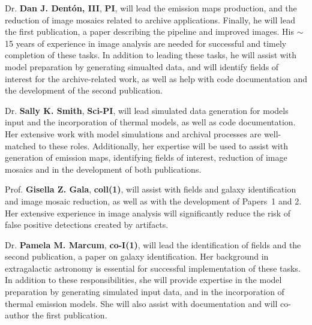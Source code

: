 %
Dr. \textbf{Dan J. Dent{\'{o}}n, III}, \textbf{PI}, will lead the emission maps production, and the reduction of image mosaics related to archive applications. Finally, he will lead the first publication, a paper describing the pipeline and improved images.  His $\sim$15 years of experience in image analysis are needed for successful and timely completion of these tasks. In addition to leading these tasks, he will assist with model preparation by generating simualted data, and will identify fields of interest for the archive-related work, as well as help with code documentation and the development of the second publication. \par
Dr. \textbf{Sally K. Smith}, \textbf{Sci-PI}, will lead simulated data generation for models input and the incorporation of thermal models, as well as code documentation.  Her extensive work with model simulations and archival processes are well-matched to these roles.  Additionally, her expertise will be used to assist with generation of emission maps, identifying fields of interest, reduction of image mosaics and in the development of both publications. \par
Prof. \textbf{Gisella Z. Gala}, \textbf{coll(1)}, will assist with fields and galaxy identification and image mosaic reduction, as well as with the development of Papers~1 and 2. Her extensive experience in image analysis will significantly reduce the risk of false positive detections created by artifacts. \par
Dr. \textbf{Pamela M. Marcum}, \textbf{co-I(1)}, will lead the identification of fields and the second publication, a paper on galaxy identification.  Her background in extragalactic astronomy is essential for successful implementation of these tasks. In addition to these responsibilities, she will provide expertise in the model preparation by generating simulated input data, and in the incorporation of thermal emission models.  She will also assist with documentation and will co-author the first publication. \par